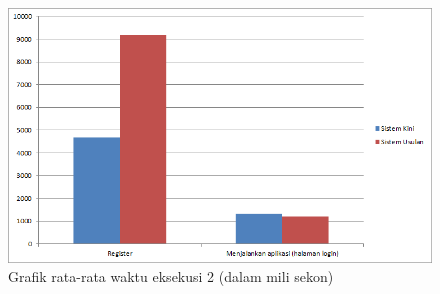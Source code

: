 \begin{figure}[htbp]
	\centering
		\includegraphics[scale=0.7]{Gambar/5_pengujianwaktu_2.png}
	\caption{Grafik rata-rata waktu eksekusi 2 (dalam mili sekon)} 
	\label{fig:5_pengujianwaktu_2}
\end{figure}

